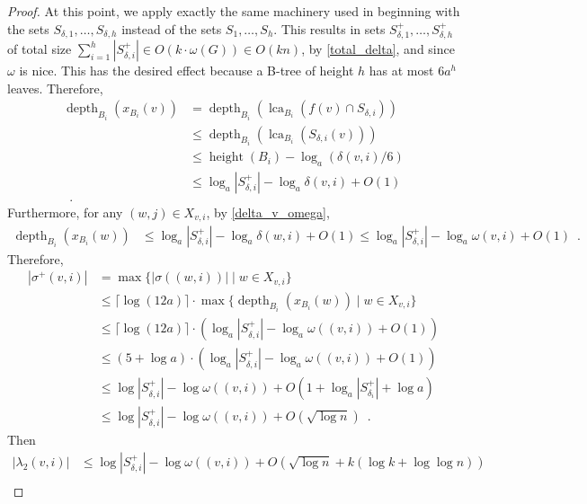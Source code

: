 \documentclass{patmorin}
\let\eqref\cref
\renewcommand{\le}{\leqslant}
\DeclareMathOperator{\height}{height}
\DeclareMathOperator{\depth}{depth}
\DeclareMathOperator{\lca}{lca}
\newcommand{\Oh}{O}
\begin{document}
\begin{proof}
    At this point, we apply exactly the same  machinery used in \cite{gawrychowski.janczewski:simpler,dujmovic.esperet.ea:adjacency} beginning with the sets $S_{\delta,1},\ldots,S_{\delta,h}$ instead of the sets $S_1,\ldots,S_h$.
    This results in sets $S^+_{\delta,1},\ldots,S^+_{\delta,h}$ of total size $\sum_{i=1}^h |S^+_{\delta,i}|\in \Oh(k\cdot\omega(G))\in \Oh(kn)$, by \eqref{total_delta}, and since $\omega$ is nice.
    This has the desired effect because a B-tree of height $h$ has at most $6a^h$ leaves.
    Therefore,
    \begin{align*}
      \depth_{B_i}(x_{B_i}(v))
       & =
      \depth_{B_i}(\lca_{B_i}(f(v)\cap S_{\delta,i}))            \\
       & \le
      \depth_{B_i}(\lca_{B_i}(S_{\delta,i}(v)))                  \\
       & \le\height(B_i)-\log_a(\delta(v,i)/6)                   \\
       & \le \log_a|S^+_{\delta,i}| - \log_a\delta(v,i) + \Oh(1) \\
      \enspace .
    \end{align*}
    Furthermore, for any $(w,j)\in X_{v,i}$, by \eqref{delta_v_omega},
    \begin{align*}
      \depth_{B_i}(x_{B_i}(w))
       & \le \log_a|S^+_{\delta,i}| - \log_a\delta(w,i) + \Oh(1)
      \le \log_a|S^+_{\delta,i}| - \log_a\omega(v,i) + \Oh(1) \enspace .
    \end{align*}
    Therefore,
    \begin{align*}
      |\sigma^+(v,i)|
       & = \max\{|\sigma((w,i))| \mid w\in X_{v,i}\}                                              \\
       & \le \lceil \log (12a)\rceil\cdot\max\{\depth_{B_i}(x_{B_i}(w)) \mid w\in X_{v,i}\}       \\
       & \le \lceil \log (12a)\rceil\cdot (\log_a|S^+_{\delta,i}| - \log_a\omega((v,i)) + \Oh(1)) \\
       & \le (5+ \log a)\cdot (\log_a|S^+_{\delta,i}| - \log_a\omega((v,i)) + \Oh(1))             \\
       & \le \log |S^+_{\delta,i}| - \log\omega((v,i)) + \Oh(1+\log_a |S^+_{\delta_i}| + \log a)  \\
       & \le \log |S^+_{\delta,i}| - \log\omega((v,i)) + \Oh(\sqrt{\log n}) \enspace .
    \end{align*}
    Then
    \begin{align*}
      |\lambda_2(v,i)|
       & \le \log |S^+_{\delta,i}|-\log \omega((v,i)) + \Oh(\sqrt{\log n} + k(\log k+\log\log n))            \\

\end{align*}
\end{proof}
\end{document}
